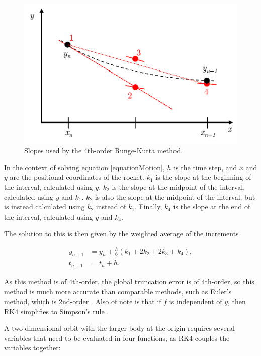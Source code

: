 \documentclass[twocolumn,prl,nobalancelastpage,aps,10pt]{revtex4-1}
\begin{document}
\begin{figure}[ht]
	\includegraphics*[width=0.96\linewidth,clip]{rk4Slopes}
	\caption{Slopes used by the 4th-order Runge-Kutta method.} \label{rk4SlopesFigure}
\end{figure}

In the context of solving equation \ref{equationMotion}, $h$ is the time step, and $x$ and $y$ are the positional coordinates of the rocket. $k_{1}$ is the slope at the beginning of the interval, calculated using $y$. $k_{2}$ is the slope at the midpoint of the interval, calculated using $y$ and $k_{1}$. $k_{2}$ is also the slope at the midpoint of the interval, but is instead calculated using $k_{2}$ instead of $k_{1}$. Finally, $k_{4}$ is the slope at the end of the interval, calculated using $y$ and $k_{4}$.

The solution to this is then given by the weighted average of the increments \cite{Press2007}

\begin{align}
y_{n+1}& = y_{n} + \frac{h}{6}(k_{1} + 2k_{2} + 2k_{3} + k_{4}) , \\
t_{n+1}& = t_{n} + h .
\end{align}\label{rungeEquation}

As this method is of 4th-order, the global truncation error is of  4th-order, so this method is much more accurate than comparable methods, such as Euler's method, which is 2nd-order \cite{Atkinson1989, Suli2003}. Also of note is that if $f$ is independent of $y$, then RK4 simplifies to Simpson's rule \cite{Suli2003}.


A two-dimensional orbit with the larger body at the origin requires several variables that need to be evaluated in four functions, as RK4 couples the variables together:
\end{document}
